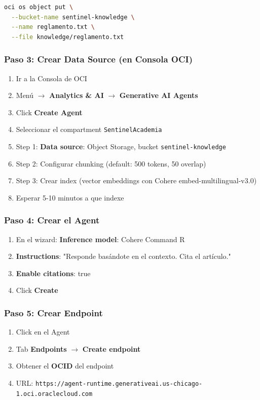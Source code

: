 \documentclass[11pt,a4paper,oneside]{article}
\begin{document}
\begin{lstlisting}[language=bash,caption={Ya lo hicimos}]
oci os object put \
  --bucket-name sentinel-knowledge \
  --name reglamento.txt \
  --file knowledge/reglamento.txt
\end{lstlisting}

\subsubsection{Paso 3: Crear Data Source (en Consola OCI)}

\begin{enumerate}
  \item Ir a la Consola de OCI
  \item Men\'u $\rightarrow$ \textbf{Analytics \& AI} $\rightarrow$ \textbf{Generative AI Agents}
  \item Click \textbf{Create Agent}
  \item Seleccionar el compartment \texttt{SentinelAcademia}
  \item Step 1: \textbf{Data source}: Object Storage, bucket \texttt{sentinel-knowledge}
  \item Step 2: Configurar chunking (default: 500 tokens, 50 overlap)
  \item Step 3: Crear index (vector embeddings con Cohere embed-multilingual-v3.0)
  \item Esperar 5-10 minutos a que indexe
\end{enumerate}

\subsubsection{Paso 4: Crear el Agent}

\begin{enumerate}
  \item En el wizard: \textbf{Inference model}: Cohere Command R
  \item \textbf{Instructions}: "Responde bas\'andote en el contexto. Cita el art\'iculo."
  \item \textbf{Enable citations}: true
  \item Click \textbf{Create}
\end{enumerate}

\subsubsection{Paso 5: Crear Endpoint}

\begin{enumerate}
  \item Click en el Agent
  \item Tab \textbf{Endpoints} $\rightarrow$ \textbf{Create endpoint}
  \item Obtener el \textbf{OCID} del endpoint
  \item URL: \texttt{https://agent-runtime.generativeai.us-chicago-1.oci.oraclecloud.com}
\end{enumerate}
\end{document}

